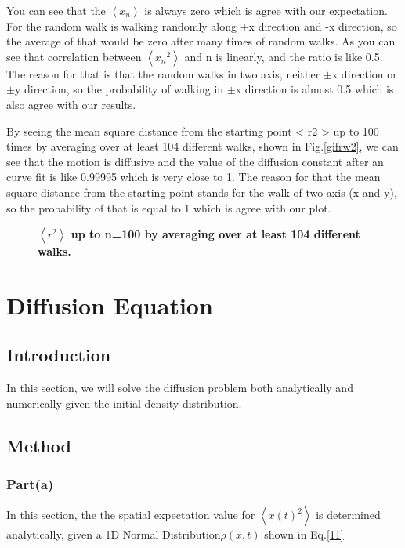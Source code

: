 \documentclass[11pt, oneside]{article}   	%
\begin{document}
You can see that the $\left \langle x_n \right\rangle$ is always zero which is agree with our expectation. For the random walk is walking randomly along +x direction and -x direction, so the average of that would be zero after many times of random walks. As you can see that correlation between $\left \langle {x_n}^2 \right\rangle$ and n is linearly, and the ratio is like 0.5. The reason for that is that the random walks in two axis, neither $\pm$x direction or $\pm$y direction, so the probability of walking in $\pm$x direction is almost 0.5 which is also agree with our results.

By seeing the mean square distance from the starting point < r2 > up to 100 times by averaging over at least 104 different walks, shown in Fig.\ref{gifrw2}, we can see that the motion is diffusive and the value of the diffusion constant after an curve fit is like 0.99995 which is very close to 1. The reason for that the mean square distance from the starting point stands for the walk of two axis (x and y), so the probability of that is equal to 1 which is agree with our plot.
  
\begin{figure}[h]
\begin{center}
\caption{{\bf $\left \langle r^2 \right\rangle$ up to n=100 by averaging over at least 104 different walks. }}
\label{figrw1}
\end{center}
\end{figure}


\section{Diffusion Equation}
\subsection{Introduction}
In this section, we will solve the diffusion problem both analytically and numerically given the initial density distribution.
\subsection{Method}
\subsubsection{Part(a)}
In this section, the the spatial expectation value for $\left \langle x(t)^2 \right\rangle$ is determined analytically, given a 1D Normal Distribution$\rho(x,t)$ shown in Eq.\eqref{11}
\end{document}
